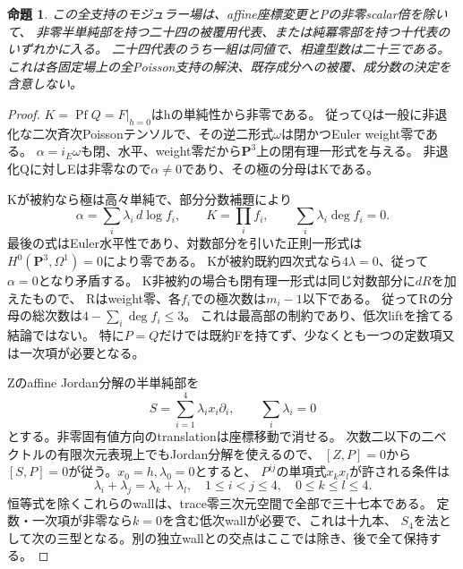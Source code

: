 \documentclass[a4paper,11pt]{ltjsarticle}
\newtheorem{proposition}{命題}[section]
\theoremstyle{definition}
\newcommand{\PP}{\mathbf P}
\begin{document}
\begin{proposition}\label{prop:hyperplane-quartic-finite-entrance}
この全支持のモジュラー場は、affine座標変更とPの非零scalar倍を除いて、
非零半単純部を持つ二十四の被覆用代表、または純冪零部を持つ十代表のいずれかに入る。
二十四代表のうち一組は同値で、相違型数は二十三である。
これは各固定場上の全Poisson支持の解決、既存成分への被覆、成分数の決定を含意しない。
\end{proposition}
\begin{proof}
$K=\operatorname{Pf}Q=F|_{h=0}$はhの単純性から非零である。
従ってQは一般に非退化な二次斉次Poissonテンソルで、その逆二形式$\omega$は閉かつEuler weight零である。
$\alpha=i_E\omega$も閉、水平、weight零だから$\PP^3$上の閉有理一形式を与える。
非退化Qに対しEは非零なので$\alpha\ne0$であり、その極の分母はKである。

Kが被約なら極は高々単純で、部分分数補題により
\[
 \alpha=\sum_i\lambda_i\,d\log f_i,\qquad
 K=\prod_i f_i,\qquad \sum_i\lambda_i\deg f_i=0.
\]
最後の式はEuler水平性であり、対数部分を引いた正則一形式は
$H^0(\PP^3,\Omega^1)=0$により零である。
Kが被約既約四次式なら$4\lambda=0$、従って$\alpha=0$となり矛盾する。
K非被約の場合も閉有理一形式は同じ対数部分に$dR$を加えたもので、
Rはweight零、各$f_i$での極次数は$m_i-1$以下である。
従ってRの分母の総次数は$4-\sum_i\deg f_i\le3$。
これは最高部の制約であり、低次liftを捨てる結論ではない。
特に$P=Q$だけでは既約Fを持てず、少なくとも一つの定数項又は一次項が必要となる。

Zのaffine Jordan分解の半単純部を
\[
 S=\sum_{i=1}^4\lambda_i x_i\partial_i,\qquad\sum_i\lambda_i=0
\]
とする。非零固有値方向のtranslationは座標移動で消せる。
次数二以下の二ベクトルの有限次元表現上でもJordan分解を使えるので、
$[Z,P]=0$から$[S,P]=0$が従う。$x_0=h,\lambda_0=0$とすると、
$P^{ij}$の単項式$x_kx_l$が許される条件は
\[
 \lambda_i+\lambda_j=\lambda_k+\lambda_l,
 \quad1\le i<j\le4,\quad0\le k\le l\le4.                    \tag{\clubsuit}
\]
恒等式を除くこれらのwallは、trace零三次元空間で全部で三十七本である。
定数・一次項が非零なら$k=0$を含む低次wallが必要で、これは十九本、
$S_4$を法として次の三型となる。別の独立wallとの交点はここでは除き、後で全て保持する。


\end{proof}
\end{document}
